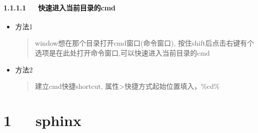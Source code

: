 \documentclass[letterpaper,12pt,english]{sphinxmanual}
\begin{document}
\subsubsection{1.1.1.1   快速进入当前目录的cmd}
\label{\detokenize{001software/001install/shell:cmd}}\begin{itemize}
\item {} 
方法1
\begin{quote}

window想在那个目录打开cmd窗口(命令窗口), 按住shift后点击右键有个选项是在此处打开命令窗口,可以快速进入当前目录的cmd
\end{quote}

\item {} 
方法2
\begin{quote}

建立cmd快捷shortcut, 属性\sphinxhyphen{}>快捷方式\sphinxhyphen{}起始位置填入，\%cd\%
\end{quote}

\end{itemize}


\chapter{1   sphinx}
\label{\detokenize{001software/001install/sphinx:sphinx}}\label{\detokenize{001software/001install/sphinx::doc}}
\end{document}
